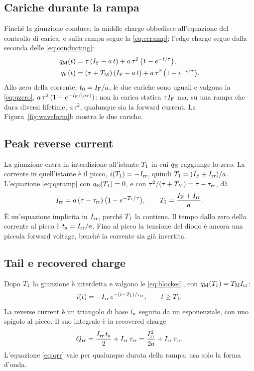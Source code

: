 \documentclass[10pt,a4paper]{scrartcl}
\let\newcommand\pdvaluedefine
\newcommand{\IF}{I_\mathrm{F}}
\newcommand{\Irr}{I_\mathrm{rr}}
\newcommand{\Qrr}{Q_\mathrm{rr}}
\newcommand{\ta}{t_\mathrm{a}}
\newcommand{\taurr}{\tau_\mathrm{rr}}
\newcommand{\TM}{T_\mathrm{M}}
\newcommand{\Tone}{T_1}
\newcommand{\qE}{q_\mathrm{E}}
\newcommand{\qM}{q_\mathrm{M}}
\begin{document}
\subsection{Cariche durante la rampa}
Finché la giunzione conduce, la middle charge obbedisce all'equazione del controllo di carica, e sulla rampa segue la \eqref{eq:ccramp}; l'edge charge segue dalla seconda delle \eqref{eq:conducting}:
\begin{align}
\qM(t) &= \tau\,(\IF - a\,t) + a\,\tau^2\,\bigl(1 - e^{-t/\tau}\bigr) , \label{eq:qmramp}\\
\qE(t) &= (\tau+\TM)\,(\IF - a\,t) + a\,\tau^2\,\bigl(1 - e^{-t/\tau}\bigr) . \label{eq:qeramp}
\end{align}
Allo zero della corrente, $t_0 = \IF/a$, le due cariche sono uguali e valgono la \eqref{eq:qzero}, $a\,\tau^2\,(1 - e^{-\IF/(a\tau)})$: non la carica statica $\tau\IF$ ma, su una rampa che dura diversi lifetime, $a\,\tau^2$, qualunque sia la forward current. La Figura~\ref{fig:waveform}b mostra le due cariche.
\subsection{Peak reverse current}
La giunzione entra in interdizione all'istante $\Tone$ in cui $\qE$ raggiunge lo zero. La corrente in quell'istante è il picco, $i(\Tone) = -\Irr$, quindi $\Tone = (\IF+\Irr)/a$. L'equazione \eqref{eq:qeramp} con $\qE(\Tone) = 0$, e con $\tau^2/(\tau+\TM) = \tau - \taurr$, dà
\begin{equation}
\Irr = a\,(\tau-\taurr)\,\bigl(1 - e^{-\Tone/\tau}\bigr) , \qquad \Tone = \frac{\IF+\Irr}{a} .
\label{eq:peak}
\end{equation}
È un'equazione implicita in $\Irr$, perché $\Tone$ la contiene. Il tempo dallo zero della corrente al picco è $\ta = \Irr/a$. Fino al picco la tensione del diodo è ancora una piccola forward voltage, benché la corrente sia già invertita.

\subsection{Tail e recovered charge}
Dopo $\Tone$ la giunzione è interdetta e valgono le \eqref{eq:blocked}, con $\qM(\Tone) = \TM\Irr$:
\begin{equation}
i(t) = -\Irr\,e^{-(t-\Tone)/\taurr} , \qquad t \geq \Tone .
\label{eq:tail}
\end{equation}
La reverse current è un triangolo di base $\ta$ seguito da un esponenziale, con uno spigolo al picco. Il suo integrale è la recovered charge
\begin{equation}
\Qrr = \frac{\Irr\,\ta}{2} + \Irr\,\taurr = \frac{\Irr^2}{2a} + \Irr\,\taurr .
\label{eq:qrr}
\end{equation}
L'equazione \eqref{eq:qrr} vale per qualunque durata della rampa: usa solo la forma d'onda.
\end{document}
